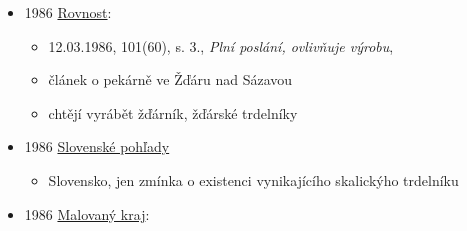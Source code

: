 \begin{itemize}
  \begin{itemize}
  \tightlist
  \item
    Malovaný kraj: národopisný a vlastivědný časopis Slovácka. Břeclav:
    Moraviapress, 1986(1), s. 21. ISSN 0323-1542.
  \item
    s. 21 článek:  \emph{O masopustě a
    masopustním pečivu}
  \item
    o masopustě a masopustním pečivu
  \item
    zmínky o různejch vesnicích, kde se historicky dělal (u Brna,
    Vyškova, Velký Meziříčí)
  \item
    na většině míst se dělají na menších formách, jen ve Skalici na
    původních trdlech na ohništi
  \item
    je tam několik jmen žen, co ve Skalici trdelníky dělají. každá má
    svůj recept i techniku
  \item
    popis přípravy u jedný z nich, už používá motorek na otáčení
  \end{itemize}
\item
  1986
  \href{https://ndk.cz/uuid/uuid:882d50d0-42f4-11f0-9463-005056825209}{Rovnost}:

  \begin{itemize}
  \tightlist
  \item
    12.03.1986, 101(60), s. 3., \emph{Plní poslání, ovlivňuje výrobu},
  \item
    článek o pekárně ve Žďáru nad Sázavou
  \item
    chtějí vyrábět žďárník, žďárské trdelníky
  \end{itemize}
\item
  1986
  \href{https://dikda.snk.sk/uuid/uuid:bcfbf53a-ce88-41a9-9e57-676c018f79a7}{Slovenské
  pohľady}

  \begin{itemize}
  \tightlist
  \item
    Slovensko, jen zmínka o existenci vynikajícího skalickýho trdelníku
  \end{itemize}
\item
  1986
  \href{https://ndk.cz/uuid/uuid:01430c20-1cbf-11e4-a8ab-001018b5eb5c}{Malovaný
  kraj}:


\end{itemize}
